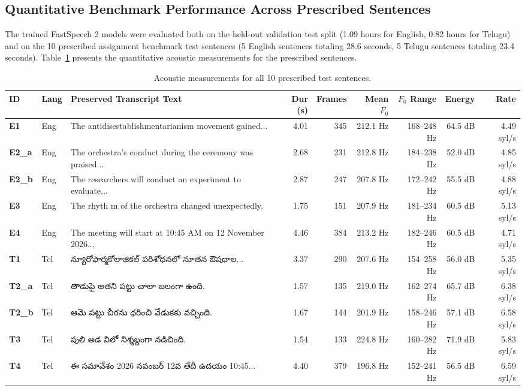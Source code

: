 \documentclass[11pt,a4paper]{article}
\newcommand{\texttelugu}[1]{{\telugufont #1}}
\begin{document}
\subsection{Quantitative Benchmark Performance Across Prescribed Sentences}
The trained FastSpeech 2 models were evaluated both on the held-out validation test split (1.09 hours for English, 0.82 hours for Telugu) and on the 10 prescribed assignment benchmark test sentences (5 English sentences totaling 28.6 seconds, 5 Telugu sentences totaling 23.4 seconds). Table~\ref{tab:eval_metrics} presents the quantitative acoustic measurements for the prescribed sentences.

\begin{table}[H]
\centering
\caption{Acoustic measurements for all 10 prescribed test sentences.}
\label{tab:eval_metrics}
\scriptsize
\begin{tabularx}{\textwidth}{llXrrrrrr}
\toprule
\textbf{ID} & \textbf{Lang} & \textbf{Preserved Transcript Text} & \textbf{Dur (s)} & \textbf{Frames} & \textbf{Mean $F_0$} & \textbf{$F_0$ Range} & \textbf{Energy} & \textbf{Rate} \\
\midrule
\textbf{E1} & Eng & The antidisestablishmentarianism movement gained... & 4.01 & 345 & 212.1 Hz & 168--248 Hz & 64.5 dB & 4.49 syl/s \\
\textbf{E2\_a} & Eng & The orchestra's conduct during the ceremony was praised... & 2.68 & 231 & 212.8 Hz & 184--238 Hz & 52.0 dB & 4.85 syl/s \\
\textbf{E2\_b} & Eng & The researchers will conduct an experiment to evaluate... & 2.87 & 247 & 207.8 Hz & 172--242 Hz & 55.5 dB & 4.88 syl/s \\
\textbf{E3} & Eng & The rhyth   m of the orchestra changed unexpectedly. & 1.75 & 151 & 207.9 Hz & 181--234 Hz & 60.5 dB & 5.13 syl/s \\
\textbf{E4} & Eng & The meeting will start at 10:45 AM on 12 November 2026... & 4.46 & 384 & 213.2 Hz & 182--246 Hz & 60.5 dB & 4.71 syl/s \\
\midrule
\textbf{T1} & Tel & \texttelugu{న్యూరోఫార్మకోలాజికల్ పరిశోధనలో నూతన ఔషధాల...} & 3.37 & 290 & 207.6 Hz & 154--258 Hz & 56.0 dB & 5.35 syl/s \\
\textbf{T2\_a} & Tel & \texttelugu{తాడుపై అతని పట్టు చాలా బలంగా ఉంది.} & 1.57 & 135 & 219.0 Hz & 162--274 Hz & 65.7 dB & 6.38 syl/s \\
\textbf{T2\_b} & Tel & \texttelugu{ఆమె పట్టు చీరను ధరించి వేడుకకు వచ్చింది.} & 1.67 & 144 & 201.9 Hz & 158--246 Hz & 57.1 dB & 6.58 syl/s \\
\textbf{T3} & Tel & \texttelugu{పులి అడ  విలో నిశ్శబ్దంగా నడిచింది.} & 1.54 & 133 & 224.8 Hz & 160--282 Hz & 71.9 dB & 5.83 syl/s \\
\textbf{T4} & Tel & \texttelugu{ఈ సమావేశం 2026 నవంబర్ 12వ తేదీ ఉదయం 10:45...} & 4.40 & 379 & 196.8 Hz & 152--241 Hz & 56.5 dB & 6.59 syl/s \\
\bottomrule
\end{tabularx}
\end{table}
\end{document}
